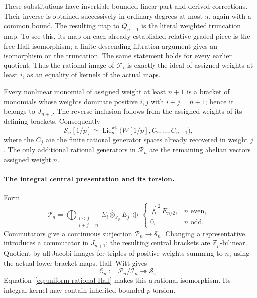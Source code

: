 These substitutions have invertible bounded linear part and
derived corrections.  Their inverse is obtained successively
in ordinary degrees at most \(n\), again with a common bound.
The resulting map to \(Q_{n-1}\) is the literal weighted
truncation map.  To see this, its map on each already
established relative graded piece is the free Hall
isomorphism; a finite descending-filtration argument gives
an isomorphism on the truncation.  The same statement holds
for every earlier quotient.  Thus the rational image of
\(\mathcal F_i\) is exactly the ideal of assigned weights at least
\(i\), as an equality of kernels of the actual maps.

Every nonlinear monomial of assigned weight at least \(n+1\)
is a bracket of monomials whose weights dominate positive
\(i,j\) with \(i+j=n+1\); hence it belongs to \(J_{n+1}\).
The reverse inclusion follows from the assigned weights of
its defining brackets.  Consequently
\begin{equation}\label{eq:uniform-rational-Hall}
 \mathcal S_n[1/p]\simeq
 \operatorname{Lie}^{\mathrm{wt}}_n
      \bigl(W[1/p],C_2,\ldots,C_{n-1}\bigr),
\end{equation}
where the \(C_j\) are the finite rational generator spaces
already recovered in weight \(j\).
The only additional rational generators in \(\mathcal R_n\) are the
remaining abelian vectors assigned weight \(n\).

\paragraph{The integral central presentation and its torsion.}
Form
\[
 \mathcal P_n=
 \bigoplus_{\substack{i<j\\i+j=n}}
       E_i\widehat\otimes_{\mathbb Z_p} E_j
 \ \oplus\
 \begin{cases}
 \widehat{\bigwedge}^{\,2}E_{n/2},&n\text{ even},\\
 0,&n\text{ odd}.
 \end{cases}
\]
Commutators give a continuous surjection
\(\mathcal P_n\to \mathcal S_n\).  Changing a representative introduces
a commutator in \(J_{n+1}\); the resulting central brackets
are \(\mathbb Z_p\)-bilinear.  Quotient by all Jacobi images
for triples of positive weights summing to \(n\), using the
actual lower bracket maps.  Hall--Witt gives
\begin{equation}\label{eq:uniform-Hall-surjection}
       \mathcal C_n:=\mathcal P_n/\mathcal I_n
                         \twoheadrightarrow \mathcal S_n.
\end{equation}
Equation~\eqref{eq:uniform-rational-Hall} makes this a rational
isomorphism.  Its integral kernel may contain inherited
bounded \(p\)-torsion.

